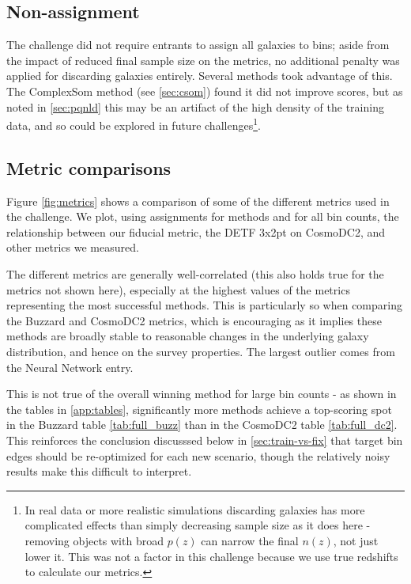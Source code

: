 \documentclass[twocolumn,twocolappendix]{aastex63}
\begin{document}
\subsection{Non-assignment}
The challenge did not require entrants to assign all galaxies to bins; aside from the impact of reduced final sample size on the metrics, no additional penalty was applied for discarding galaxies entirely.  Several methods
took advantage of this.  The ComplexSom method (see \autoref{sec:csom}) found
it did not improve scores, but as noted in \autoref{sec:pqnld} this may be an artifact
of the high density of the training data, and so could be explored in future challenges\footnote{In real data or more realistic simulations discarding galaxies has more complicated effects than simply decreasing sample size as it does here - removing objects with broad $p(z)$ can narrow the final $n(z)$, not just lower it. This was not a factor in this challenge because we use true redshifts to calculate our metrics.}.


\subsection{Metric comparisons} \label{sec:metric-results}
Figure \ref{fig:metrics} shows a comparison of some of the different metrics used in the challenge.
We plot, using assignments for methods and for all bin counts, the relationship between our fiducial
metric, the DETF 3x2pt on CosmoDC2, and other metrics we measured.

The different metrics are generally well-correlated (this also holds true for the metrics not 
shown here), especially at the highest values of the metrics representing the most successful
methods. This is particularly so when comparing the Buzzard and CosmoDC2 metrics, which is encouraging 
as it implies these methods are broadly stable to reasonable changes in the underlying galaxy
distribution, and hence on the survey properties.  The largest outlier comes from the 
{\sc Neural Network} entry.

This is not true of the overall winning method for large bin counts - as shown in the tables
in \autoref{app:tables}, significantly more methods achieve a top-scoring spot in the Buzzard
table \ref{tab:full_buzz} than in the CosmoDC2 table \ref{tab:full_dc2}. This reinforces the
conclusion discusssed below in \autoref{sec:train-vs-fix} that target bin edges should be 
re-optimized for each new scenario, though the relatively noisy
results make this difficult to interpret.
\end{document}
